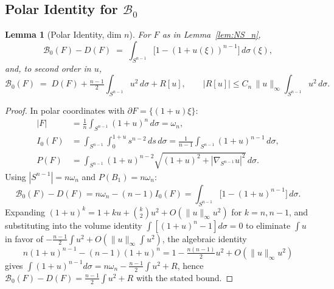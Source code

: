 \documentclass[11pt]{article}
\newtheorem{lemma}[theorem]{Lemma}
\newcommand{\B}{\mathcal{B}}
\begin{document}
\subsection{Polar Identity for $\B_0$}
\begin{lemma}[Polar Identity, dim $n$] \label{lem:PolarId_n}
For $F$ as in Lemma~\ref{lem:NS_n},
\[
   \B_0(F) - D(F) \;=\; \int_{S^{n-1}}\!\bigl[1 - (1+u(\xi))^{n-1}\bigr]\,d\sigma(\xi),
\]
and, to second order in $u$,
\[
   \B_0(F) \;=\; D(F) + \tfrac{n-1}{2}\!\int_{S^{n-1}}\! u^2\,d\sigma + R[u], \qquad |R[u]| \le C_n\,\|u\|_\infty\!\int_{S^{n-1}}\! u^2\,d\sigma.
\]
\end{lemma}
\begin{proof}
In polar coordinates with $\partial F = \{(1+u)\xi\}$:
\begin{align*}
   |F| &= \tfrac{1}{n}\!\int_{S^{n-1}}\!(1+u)^n\,d\sigma = \omega_n, \\
   I_0(F) &= \int_{S^{n-1}}\!\int_0^{1+u}\!\!s^{n-2}\,ds\,d\sigma = \tfrac{1}{n-1}\!\int_{S^{n-1}}\!(1+u)^{n-1}\,d\sigma, \\
   P(F) &= \int_{S^{n-1}}\!(1+u)^{n-2}\sqrt{(1+u)^2+|\nabla_{S^{n-1}} u|^2}\,d\sigma.
\end{align*}
Using $|S^{n-1}|=n\omega_n$ and $P(B_1)=n\omega_n$:
\[
  \B_0(F) - D(F) = n\omega_n - (n-1)I_0(F) = \int_{S^{n-1}}\!\bigl[1 - (1+u)^{n-1}\bigr]\,d\sigma.
\]
Expanding $(1+u)^k = 1 + ku + \binom{k}{2}u^2 + O(\|u\|_\infty u^2)$ for $k = n, n-1$, and substituting into the volume identity $\int[(1+u)^n - 1]d\sigma = 0$ to eliminate $\int u$ in favor of $-\tfrac{n-1}{2}\int u^2 + O(\|u\|_\infty\int u^2)$, the algebraic identity
\[
   n(1+u)^{n-1} - (n-1)(1+u)^n = 1 - \tfrac{n(n-1)}{2}u^2 + O(\|u\|_\infty u^2)
\]
gives $\int(1+u)^{n-1}d\sigma = n\omega_n - \tfrac{n-1}{2}\int u^2 + R$, hence $\B_0(F) - D(F) = \tfrac{n-1}{2}\int u^2 + R$ with the stated bound. \qedhere
\end{proof}
\end{document}

